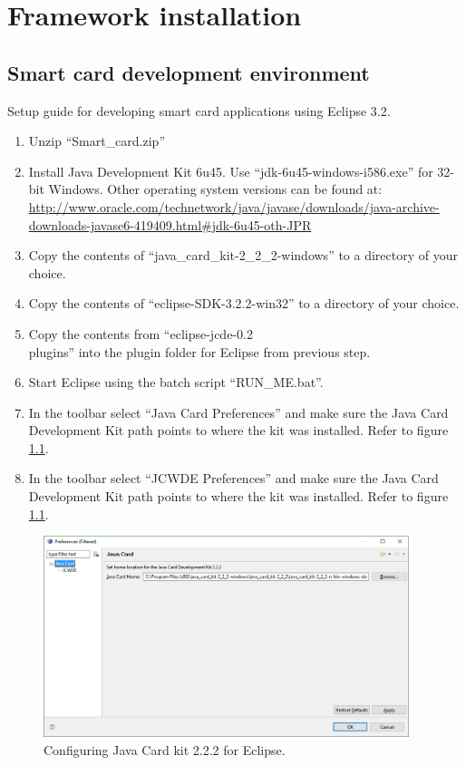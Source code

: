 \chapter{Framework installation}
\label{app:D}
\section{Smart card development environment}
Setup guide for developing smart card applications using Eclipse 3.2.
\begin{enumerate}
  \item Unzip ``Smart\_card.zip''
  \item Install Java Development Kit 6u45. Use ``jdk-6u45-windows-i586.exe'' for 32-bit Windows. Other operating system versions can be found at: \sloppy \url{http://www.oracle.com/technetwork/java/javase/downloads/java-archive-downloads-javase6-419409.html#jdk-6u45-oth-JPR}
  \item Copy the contents of ``java\_card\_kit-2\_2\_2-windows'' to a directory of your choice.
  \item Copy the contents of ``eclipse-SDK-3.2.2-win32'' to a directory of your choice.
  \item Copy the contents from ``eclipse-jcde-0.2\\plugins'' into the plugin folder for Eclipse from previous step.
  \item Start Eclipse using the batch script ``RUN\_ME.bat''.
  \item In the toolbar select ``Java Card \textrightarrow Preferences'' and make sure the Java Card Development Kit path points to where the kit was installed. Refer to figure \ref{fig:javacardkit}.
  \item In the toolbar select ``JCWDE \textrightarrow Preferences'' and make sure the Java Card Development Kit path points to where the kit was installed. Refer to figure \ref{fig:javacardkit}.

\end{enumerate}

\begin{figure}[h!]
  \caption{Configuring Java Card kit 2.2.2 for Eclipse.}
  \label{fig:javacardkit}
  \centering
    \includegraphics[width=0.95\textwidth]{images/eclipse_javacard.png}
\end{figure}

